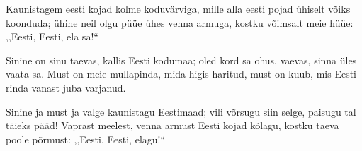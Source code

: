 Kaunistagem eesti kojad
kolme koduv\"arviga,
mille alla eesti pojad
\"uhiselt v\~oiks koonduda;
\"uhine neil olgu p\"u\"ue
\"uhes venna armuga,
kostku v\~oimsalt meie h\"u\"ue:
,,Eesti, Eesti, ela sa!{``}

Sinine on sinu taevas,
kallis Eesti kodumaa;
oled kord sa ohus, vaevas,
sinna \"ules vaata sa.
Must on meie mullapinda,
mida higis haritud,
must on kuub, mis Eesti rinda
vanast juba varjanud.

Sinine ja must ja valge
kaunistagu Eestimaad;
vili v\~orsugu siin selge,
paisugu tal t\"aieks p\"a\"ad!
Vaprast meelest, venna armust
Eesti kojad k\~olagu,
kostku taeva poole p\~ormust:
,,Eesti, Eesti, elagu!{``}